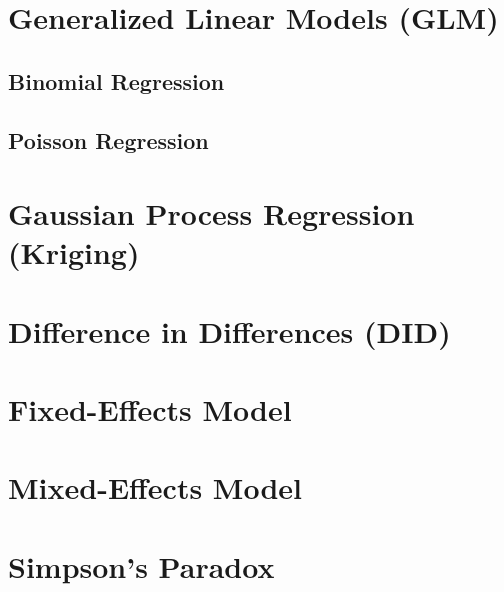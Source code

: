 \section{Generalized Linear Models (GLM)}
\label{regression:GLM}

\subsection{Binomial Regression}
\label{regression:GLM:binomial}

\subsection{Poisson Regression}
\label{regression:GLM:poisson}

\section{Gaussian Process Regression (Kriging)}
\label{regression:kriging}


\section{Difference in Differences (DID)}
\label{regression:DID}

\section{Fixed-Effects Model}
\label{regression:fixed_effects}

\section{Mixed-Effects Model}
\label{regression:mixed_effects}

\section{Simpson's Paradox}
\label{regression:simpsons_paradox}
